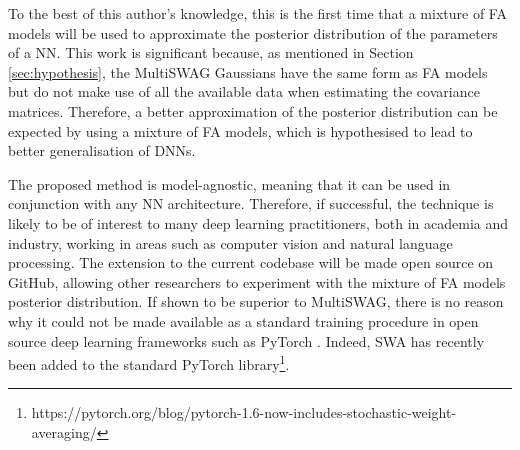 \documentclass[a4paper,11pt]{article}
\begin{document}
To the best of this author's knowledge, this is the first time that a mixture of FA models will be used to approximate the posterior distribution of the parameters of a NN. This work is significant because, as mentioned in Section \ref{sec:hypothesis}, the MultiSWAG Gaussians have the same form as FA models but do not make use of all the available data when estimating the covariance matrices. Therefore, a better approximation of the posterior distribution can be expected by using a mixture of FA models, which is hypothesised to lead to better generalisation of DNNs. 





The proposed method is model-agnostic, meaning that it can be used in conjunction with any NN architecture. Therefore, if successful, the technique is likely to be of interest to many deep learning practitioners, both in academia and industry, working in areas such as computer vision and natural language processing. The extension to the current codebase will be made open source on GitHub, allowing other researchers to experiment with the mixture of FA models posterior distribution. If shown to be superior to MultiSWAG, there is no reason why it could not be made available as a standard training procedure in open source deep learning frameworks such as PyTorch \cite{paszke2019}. Indeed, SWA has recently been added to the standard PyTorch library\footnote{https://pytorch.org/blog/pytorch-1.6-now-includes-stochastic-weight-averaging/}.   
\end{document}
